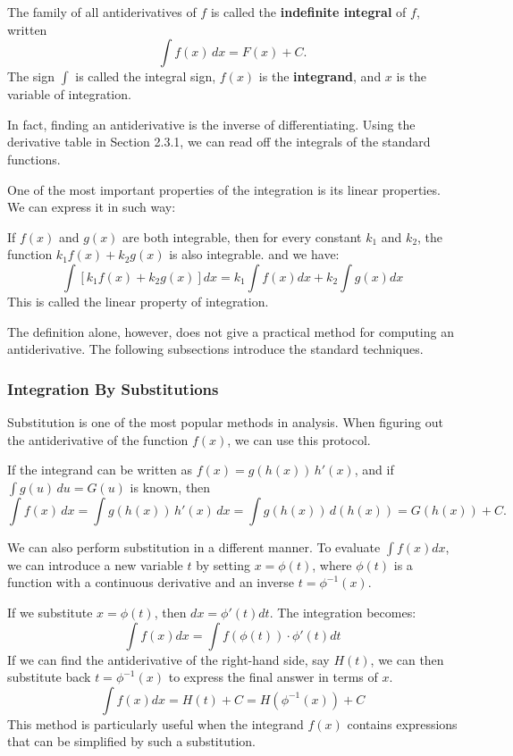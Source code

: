 \begin{definition}
The family of all antiderivatives of $f$ is called the \textbf{indefinite integral} of $f$, written
\[
\int f(x)\,dx = F(x)+C.
\]
The sign $\int$ is called the integral sign, $f(x)$ is the \textbf{integrand}, and $x$ is the variable of integration.
\end{definition}

In fact, finding an antiderivative is the inverse of differentiating. Using the derivative table in Section 2.3.1, we can read off the integrals of the standard functions.

One of the most important properties of the integration is its linear properties. We can express it in such way:

\begin{theorem}
If $f(x)$ and $g(x)$ are both integrable, then for every constant $k_1$ and $k_2$, the function $k_1f(x)+k_2g(x)$ is also integrable. and we have:
\[
\int[k_1f(x)+k_2g(x)]dx = k_1\int f(x) dx+k_2\int g(x)dx
\]
This is called the linear property of integration.
\end{theorem}

The definition alone, however, does not give a practical method for computing an antiderivative. The following subsections introduce the standard techniques.

\subsubsection{Integration By Substitutions}
Substitution is one of the most popular methods in analysis. When figuring out the antiderivative of the function $f(x)$, we can use this protocol.

\begin{definition}
If the integrand can be written as $f(x)=g(h(x))\,h'(x)$, and if $\int g(u)\,du=G(u)$ is known, then
\[
\int f(x)\,dx = \int g(h(x))\,h'(x)\,dx = \int g(h(x))\,d(h(x)) = G(h(x))+C.
\]
\end{definition}

\begin{definition}
We can also perform substitution in a different manner. To evaluate $\int f(x) dx$, we can introduce a new variable $t$ by setting $x = \phi(t)$, where $\phi(t)$ is a function with a continuous derivative and an inverse $t = \phi^{-1}(x)$.

If we substitute $x = \phi(t)$, then $dx = \phi'(t) dt$. The integration becomes:
\[
\int f(x) dx = \int f(\phi(t)) \cdot \phi'(t) dt
\]
If we can find the antiderivative of the right-hand side, say $H(t)$, we can then substitute back $t = \phi^{-1}(x)$ to express the final answer in terms of $x$.
\[
\int f(x) dx = H(t) + C = H(\phi^{-1}(x)) + C
\]
This method is particularly useful when the integrand $f(x)$ contains expressions that can be simplified by such a substitution.
\end{definition}

